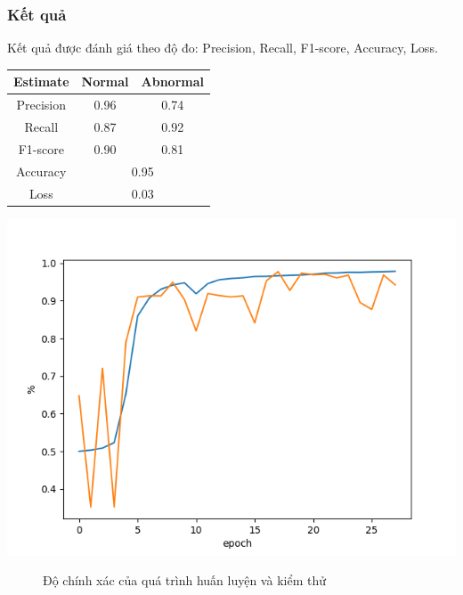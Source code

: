 \subsubsection{Kết quả}
Kết quả được đánh giá theo độ đo: Precision, Recall, F1-score, Accuracy, Loss.
\begin{center}
    \begin{tabular}{|c|c|c|}
    \hline
    Estimate & Normal & Abnormal\\
    \hline 
    Precision & 0.96 & 0.74\\ 
    \hline 
    Recall & 0.87 & 0.92\\
    \hline 
    F1-score & 0.90 & 0.81\\
    \hline 
    Accuracy & \multicolumn{2}{|c|}{0.95} \\
    \hline 
    Loss & \multicolumn{2}{|c|}{0.03} \\
    \hline
    \end{tabular}
\end{center}
\begin{center}
    \includegraphics[scale=.6]{image/chapter6/acc.png}
    \begin{figure}[htp]
    \begin{center}
    \end{center}
    \caption{Độ chính xác của quá trình huấn luyện và kiểm thử}
    \end{figure}
\end{center}

